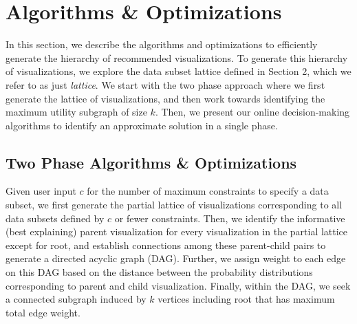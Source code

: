 \begin{center}
\end{center}



\section{Algorithms \& Optimizations}
In this section, we describe the algorithms and optimizations to efficiently generate the hierarchy of recommended visualizations. To generate this hierarchy of visualizations, we explore the data subset lattice defined in Section 2, which we refer to as just \emph{lattice}. We start with the two phase approach where we first generate the lattice of visualizations, and then work towards identifying the maximum utility subgraph of size $k$. Then, we present our online decision-making algorithms to identify an approximate solution in a single phase. 


\subsection{Two Phase Algorithms \& Optimizations}
Given user input $c$ for the number of maximum constraints to specify a data subset, we first generate the partial lattice of visualizations corresponding to all data subsets defined by $c$ or fewer constraints. Then, we identify the informative (best explaining) parent visualization for every visualization in the partial lattice except for root, and establish connections among these parent-child pairs to generate a directed acyclic graph (DAG). Further, we assign weight to each edge on this DAG based on the distance between the probability distributions corresponding to parent and child visualization. Finally, within the DAG, we seek a connected subgraph induced by $k$ vertices including root that has maximum total edge weight. 

